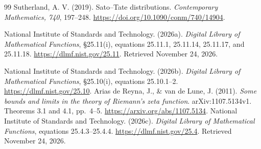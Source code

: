 \documentclass[11pt]{article}
\theoremstyle{definition}\newtheorem{definition}[theorem]{Definition}
\begin{document}
\begin{thebibliography}{99}
Sutherland, A. V. (2019). Sato--Tate distributions. \emph{Contemporary Mathematics, 740}, 197--248. \url{https://doi.org/10.1090/conm/740/14904}.

National Institute of Standards and Technology. (2026a).
\emph{Digital Library of Mathematical Functions}, \S25.11(i),
equations 25.11.1, 25.11.14, 25.11.17, and 25.11.18.
\url{https://dlmf.nist.gov/25.11}. Retrieved November 24, 2026.

National Institute of Standards and Technology. (2026b). \emph{Digital Library of Mathematical Functions}, \S25.10(i), equations 25.10.1--2. \url{https://dlmf.nist.gov/25.10}.
Arias de Reyna, J., \& van de Lune, J. (2011). \emph{Some bounds and limits in the theory of Riemann's zeta function}. arXiv:1107.5134v1. Theorems 3.1 and 4.1, pp.~4--5. \url{https://arxiv.org/abs/1107.5134}.
National Institute of Standards and Technology. (2026c).
\emph{Digital Library of Mathematical Functions}, equations 25.4.3--25.4.4.
\url{https://dlmf.nist.gov/25.4}. Retrieved November 24, 2026.

\end{thebibliography}
\end{document}
